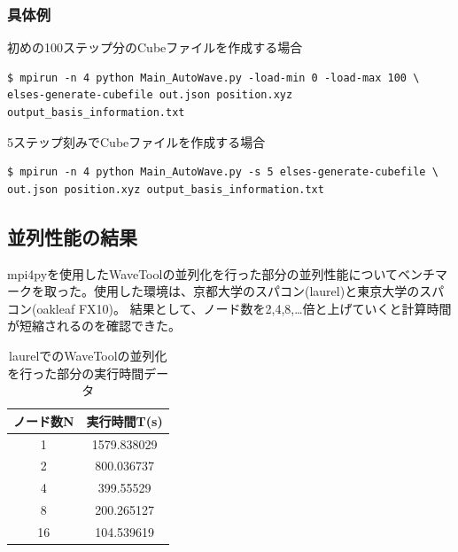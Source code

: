 \documentclass{jsarticle}
\begin{document}
\subsubsection{具体例}
初めの100ステップ分のCubeファイルを作成する場合
\begin{Verbatim}[frame=single]
$ mpirun -n 4 python Main_AutoWave.py -load-min 0 -load-max 100 \
elses-generate-cubefile out.json position.xyz output_basis_information.txt
\end{Verbatim}
5ステップ刻みでCubeファイルを作成する場合
\begin{Verbatim}[frame=single]
$ mpirun -n 4 python Main_AutoWave.py -s 5 elses-generate-cubefile \
out.json position.xyz output_basis_information.txt
\end{Verbatim}

\subsection{並列性能の結果}
mpi4pyを使用したWaveToolの並列化を行った部分の並列性能についてベンチマークを取った。使用した環境は、京都大学のスパコン(laurel)と東京大学のスパコン(oakleaf FX10)。
結果として、ノード数を2,4,8,…倍と上げていくと計算時間が短縮されるのを確認できた。

\begin{table}[H]
  \centering
  \caption{laurelでのWaveToolの並列化を行った部分の実行時間データ}
  \label{table:pi-02}

  \begin{tabular}{|c|c|} \hline
   ノード数N & 実行時間T(s) \\ \hline
   1 & 1579.838029 \\ \hline
   2 & 800.036737 \\ \hline
   4 & 399.55529 \\ \hline
   8 & 200.265127 \\ \hline
  16 & 104.539619 \\ \hline
  \end{tabular}
\end{table}
\end{document}
